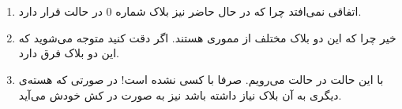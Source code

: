 \section{}
\begin{enumerate}
    \item اتفاقی نمی‌افتد چرا که در حال حاضر نیز بلاک شماره 0 در حالت  قرار دارد.
    \item خیر چرا که این دو بلاک مختلف از مموری هستند. اگر دقت کنید متوجه می‌شوید که  این دو بلاک فرق دارد.
    \item با این حالت در حالت  می‌رویم. صرفا با کسی  نشده است!
    در صورتی که هسته‌ی دیگری به آن بلاک نیاز داشته باشد نیز به صورت  در کش خودش می‌آید.
\end{enumerate}